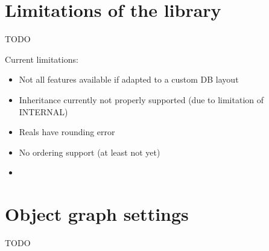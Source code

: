 \section{Limitations of the library}
TODO

Current limitations:
\begin{itemize}
\item Not all features available if adapted to a custom DB layout 
\item Inheritance currently not properly supported (due to limitation of INTERNAL)
\item Reals have rounding error
\item No ordering support (at least not yet)
\item
\end{itemize}


\section{Object graph settings}

TODO






